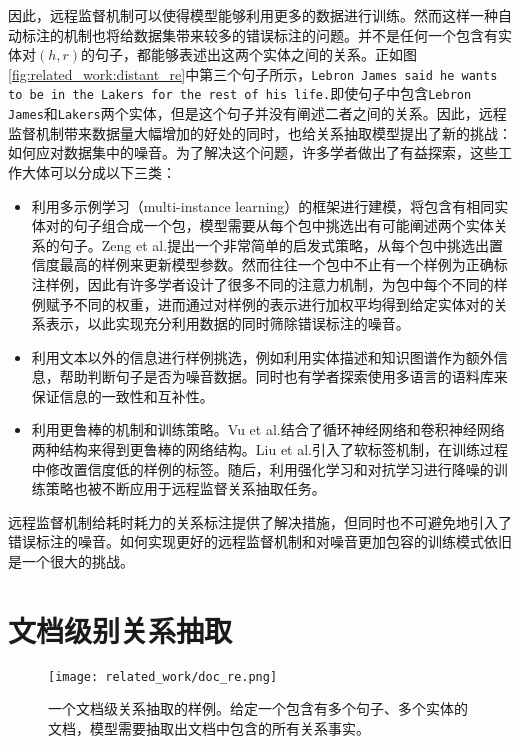 因此，远程监督机制可以使得模型能够利用更多的数据进行训练。然而这样一种自动标注的机制也将给数据集带来较多的错误标注的问题。并不是任何一个包含有实体对$(h,r)$的句子，都能够表述出这两个实体之间的关系。正如图\ref{fig:related_work:distant_re}中第三个句子所示，\texttt{Lebron James said he wants to be in the Lakers for the rest of his life.}即使句子中包含\texttt{Lebron James}和\texttt{Lakers}两个实体，但是这个句子并没有阐述二者之间的关系。因此，远程监督机制带来数据量大幅增加的好处的同时，也给关系抽取模型提出了新的挑战：如何应对数据集中的噪音。为了解决这个问题，许多学者做出了有益探索，这些工作大体可以分成以下三类：
\begin{itemize}
	\item 利用多示例学习（multi-instance learning）的框架进行建模，将包含有相同实体对的句子组合成一个包，模型需要从每个包中挑选出有可能阐述两个实体关系的句子。Zeng et al.\cite{zeng2015distant}提出一个非常简单的启发式策略，从每个包中挑选出置信度最高的样例来更新模型参数。然而往往一个包中不止有一个样例为正确标注样例，因此有许多学者设计了很多不同的注意力机制，为包中每个不同的样例赋予不同的权重，进而通过对样例的表示进行加权平均得到给定实体对的关系表示，以此实现充分利用数据的同时筛除错误标注的噪音\cite{lin2016neural,han2018hierarchical,zhu2019improving}。
	\item 利用文本以外的信息进行样例挑选，例如利用实体描述\cite{ji2017distant}和知识图谱\cite{han2018neural,qu2019fine}作为额外信息，帮助判断句子是否为噪音数据。同时也有学者探索使用多语言的语料库来保证信息的一致性和互补性\cite{verga2016multilingual,lin2017neural,wang2018adversarial}。
	\item 利用更鲁棒的机制和训练策略。Vu et al.\cite{vu2016combining}结合了循环神经网络和卷积神经网络两种结构来得到更鲁棒的网络结构。Liu et al.\cite{liu2017soft}引入了软标签机制，在训练过程中修改置信度低的样例的标签。随后，利用强化学习\cite{feng2018reinforcement,zeng2018large}和对抗学习\cite{wu2017adversarial,wang2018adversarial}进行降噪的训练策略也被不断应用于远程监督关系抽取任务。
\end{itemize}

远程监督机制给耗时耗力的关系标注提供了解决措施，但同时也不可避免地引入了错误标注的噪音。如何实现更好的远程监督机制和对噪音更加包容的训练模式依旧是一个很大的挑战。


\section{文档级别关系抽取}
\begin{figure*}
	\centering
	\texttt{[image: related\_work/doc\_re.png]}
	\caption{一个文档级关系抽取的样例。给定一个包含有多个句子、多个实体的文档，模型需要抽取出文档中包含的所有关系事实。}
	\label{fig:related_work:doc_re}
\end{figure*}

